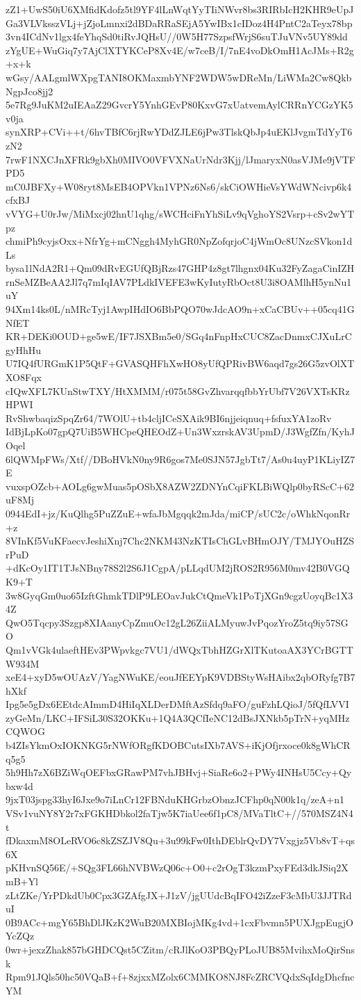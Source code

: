 zZ1+UwS50iU6XMfidKdofz5tl9YF4lLnWqtYyTIiNWvr8bs3RIRbIcH2KHR9eUpJ
Ga3VLVksszVLj+jZjoLmnxi2dBDaRRaSEjA5YwIBx1cIDoz4H4PntC2aTeyx78bp
3vn4ICdNv1lgx4feYhqSd0tiRvJQHsU//0W5H77SzpsfWrjS6suTJuVNv5UY89dd
zYgUE+WuGiq7y7AjClXTYKCeP8Xv4E/w7ceB/I/7nE4voDkOmH1AcJMs+R2g+x+k
wGsy/AALgmlWXpgTANI8OKMaxmbYNF2WDW5wDReMn/LiWMa2Cw8QkbNgpJco8jj2
5e7Rg9JuKM2uIEAaZ29GvcrY5YnhGEvP80KxvG7xUatvemAylCRRnYCGzYK5v0ja
synXRP+CVi++t/6hvTBfC6rjRwYDdZJLE6jPw3TlskQbJp4uEKlJvgmTdYyT6zN2
7rwF1NXCJnXFRk9gbXh0MIVO0VFVXNaUrNdr3Kjj/lJmaryxN0asVJMe9jVTFPD5
mC0JBFXy+W08ryt8MsEB4OPVkn1VPNz6Ns6/skCiOWHieVsYWdWNcivp6k4cfxBJ
vVYG+U0rJw/MiMxcj02hnU1qhg/sWCHciFnYhSiLv9qVghoYS2Vsrp+cSv2wYTpz
chmiPh9cyjsOxx+NfrYg+mCNggh4MyhGR0NpZofqrjoC4jWmOc8UNzcSVkon1dLs
bysa1lNdA2R1+Qm09dRvEGUfQBjRzs47GHP4z8gt7lhgnx04Ku32FyZagaCinIZH
rnSeMZBeAA2Jl7q7mIqIAV7PLdkIVEFE3wKyIutyRbOct8U3i8OAMlhH5ynNu1uY
94Xm14ks0L/nMRcTyj1AwpIHdIO6BbPQO70wJdcAO9n+xCaCBUv++05cq41GNfET
KR+DEKi0OUD+ge5wE/IF7JSXBm5e0/SGq4nFnpHxCUC8ZacDnmxCJXuLrCgyHhHu
U7IQ4fURGmK1P5QtF+GVASQHFhXwHO8yUfQPRivBW6aqd7gs26G5zvOlXTXO8Fqx
cIQwXFL7KUnStwTXY/HtXMMM/r075t58GvZhvarqqfbbYrUbf7V26VXTsKRzHPWI
RvShwbaqizSpqZr64/7WOlU+tb4cljICeSXAik9BI6njjeiqnuq+fsfuxYA1zoRv
IdBjLpKo07gpQ7UiB5WHCpeQHEOdZ+Un3WxzrskAV3UpmD/J3WgfZfn/KyhJOqel
6lQWMpFWs/Xtf//DBoHVkN0ny9R6gos7Me0SJN57JgbTt7/As0u4uyP1KLiyIZ7E
vuxspOZcb+AOLg6gwMuas5pOSbX8AZW2ZDNYnCqiFKLBiWQlp0byRScC+62uF8Mj
0944EdI+jz/KuQlhg5PuZZuE+wfaJbMgqqk2mJda/miCP/sUC2c/oWhkNqonRr+z
8VInKf5VuKFaecvJeshiXnj7Chc2NKM43NzKTIsChGLvBHmOJY/TMJYOuHZSrPuD
+dKcOy1IT1TJsNBny78S2l2S6J1CgpA/pLLqdUM2jROS2R956M0mv42B0VGQK9+T
3w8GyqGm0uo65IzftGhmkTDlP9LEOavJukCtQmeVk1PoTjXGn9cgzUoyqBc1X34Z
QwO5Tqcpy3Szgp8XIAanyCpZmuOc12gL26ZiiALMyuwJvPqozYroZ5tq9iy57SGO
Qm1vVGk4ulaeftHEv3PWpvkgc7VU1/dWQxTbhHZGrXlTKutoaAX3YCrBGTTW934M
xeE4+xyD5wOUAzV/YagNWuKE/eouJfEEYpK9VDBStyWsHAibx2qbORyfg7B7hXkf
Ipg5e5gDx6EEtdcAImmD4HiIqXLDerDMftAzSfdq9aFO/guFzhLQioJ/5fQfLVVI
zyGeMn/LKC+IFSiL30S32OKKu+1Q4A3QCfIeNC12dBsJXNkb5pTrN+yqMHzCQWOG
b4ZIsYkmOxIOKNKG5rNWfORgfKDOBCutsIXb7AVS+iKjOfjrxoce0k8gWhCRq5g5
5h9Hh7zX6BZiWqOEFbxGRawPM7vhJBHvj+SiaRe6o2+PWy4INHsU5Ccy+Qybxw4d
9jxT03jspg33hyI6Jxe9o7iLnCr12FBNduKHGrbzObnzJCFhp0qN00k1q/zeA+n1
VSv1vuNY8Y2r7xFGKHDbkol2faTjw5K7iaUee6f1pC8/MVaTltC+//570MSZ4N4t
fDkaxmM8OLeRVO6c8kZSZJV8Qu+3u99kFw0IthDEblrQvDY7Vxgjz5Vb8vT+qs6X
pKHvnSQ56E/+SQg3FL66hNVBWzQ06c+O0+c2rOgT3kzmPxyFEd3dkJSiq2XmB+Yl
zLtZKe/YrPDkdUb0Cpx3GZAfgJX+J1zV/jgUUdcBqIFO42iZzeF3cMbU3JJTRduI
0B9ACc+mgY65BhDlJKzK2WuB20MXBIojMKg4vd+1cxFbvmn5PUXJgpEugjOYcZQz
0wr+jexzZhak857bGHDCQst5CZitm/cRJlKoO3PBQyPLoJUB85MvihxMoQirSnsk
Rpm91JQls50hc50VQaB+f+8zjxxMZolx6CMMKO8NJ8FcZRCVQdxSqIdgDhcfncYM
